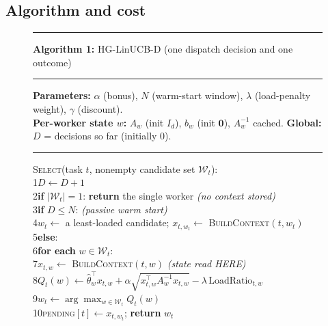 \documentclass[final,5p,times,twocolumn]{elsarticle}
\begin{document}
\subsection{Algorithm and cost}
\label{sec:algo}

\begin{figure}[t]
\centering
\begin{minipage}{\columnwidth}
\footnotesize
\hrule\vspace{3pt}
\textbf{Algorithm 1:} HG-LinUCB-D (one dispatch decision and one outcome)
\vspace{3pt}\hrule\vspace{4pt}
\noindent\textbf{Parameters:} $\alpha$ (bonus), $N$ (warm-start window), $\lambda$ (load-penalty weight), $\gamma$ (discount).\\
\noindent\textbf{Per-worker state $w$:} $A_w$ (init $I_d$), $b_w$ (init $\mathbf{0}$), $A_w^{-1}$ cached. \textbf{Global:} $D$ = decisions so far (initially 0).
\vspace{4pt}\hrule\vspace{4pt}
\noindent\textsc{Select}(task $t$, nonempty candidate set $\mathcal{W}_t$):\\
\hspace*{0.6em}1\quad $D\leftarrow D+1$\\
\hspace*{0.6em}2\quad \textbf{if} $|\mathcal{W}_t|=1$: \textbf{return} the single worker \textit{(no context stored)}\\
\hspace*{0.6em}3\quad \textbf{if} $D\le N$: \textit{(passive warm start)}\\
\hspace*{0.6em}4\quad\quad $w_t\leftarrow$ a least-loaded candidate; $x_{t,w_t}\leftarrow$ \textsc{BuildContext}$(t,w_t)$\\
\hspace*{0.6em}5\quad \textbf{else}:\\
\hspace*{0.6em}6\quad\quad \textbf{for each} $w\in\mathcal{W}_t$:\\
\hspace*{0.6em}7\quad\quad\quad $x_{t,w}\leftarrow$ \textsc{BuildContext}$(t,w)$ \textit{(state read HERE)}\\
\hspace*{0.6em}8\quad\quad\quad $Q_t(w)\leftarrow\hat\theta_w^\top x_{t,w}+\alpha\sqrt{x_{t,w}^\top A_w^{-1}x_{t,w}}-\lambda\,\text{LoadRatio}_{t,w}$\\
\hspace*{0.6em}9\quad\quad $w_t\leftarrow\arg\max_{w\in\mathcal{W}_t}Q_t(w)$\\
\hspace*{0.3em}10\quad \textsc{pending}$[t]\leftarrow x_{t,w_t}$; \textbf{return} $w_t$
\vspace{4pt}


\end{minipage}
\end{figure}
\end{document}
